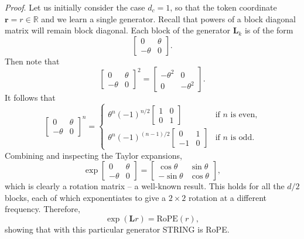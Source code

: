 \emph{Proof}.
Let us initially consider the case $d_c=1$, so that the token coordinate $\mathbf{r}=r \in \mathbb{R}$ and we learn a single generator.
Recall that powers of a block diagonal matrix will remain block diagonal.
Each block of the generator $\mathbf{L}_k$ is of the form
\begin{equation}
    \begin{bmatrix}
0 & \theta \\
-\theta & 0
\end{bmatrix}.
\end{equation}
Then note that
\begin{equation}
\begin{bmatrix}
0 & \theta \\
-\theta & 0
\end{bmatrix}^2 = \begin{bmatrix}
-\theta^2 & 0  \\
0 & -\theta^2
\end{bmatrix}.
\end{equation}
It follows that
\begin{equation}
\begin{bmatrix}
0 & \theta \\
-\theta & 0
\end{bmatrix}^n = 
\begin{cases}
\theta^n(-1)^{n/2} \begin{bmatrix}
1 & 0 \\
0 & 1
\end{bmatrix} & \textrm{if } n \textrm{ is even,} \\
\theta^n(-1)^{(n-1)/2} \begin{bmatrix}
0 & 1 \\
-1 & 0
\end{bmatrix} & \textrm{if } n \textrm{ is odd.}
\end{cases}
\end{equation}
Combining and inspecting the Taylor expansions, 
\begin{equation}
    \exp \begin{bmatrix}
0 & \theta \\
-\theta & 0
\end{bmatrix} = \begin{bmatrix}
\cos \theta & \sin \theta \\
-\sin \theta & \cos \theta
\end{bmatrix},
\end{equation}
which is clearly a rotation matrix -- a well-known result.
This holds for all the $d/2$ blocks, each of which exponentiates to give a $2 \times 2$ rotation at a different frequency.
Therefore, 
\begin{equation}
    \exp(\mathbf{L}r) = \textrm{RoPE}(r),
\end{equation}
showing that with this particular generator STRING is RoPE.

